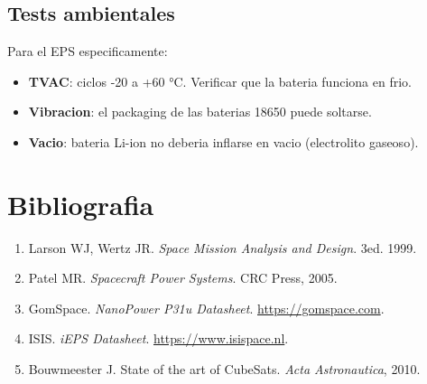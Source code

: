 \documentclass[11pt,a4paper,oneside,openright]{book}
\begin{document}
\section{Tests ambientales}

Para el EPS especificamente:
\begin{itemize}[leftmargin=2em]
  \item \textbf{TVAC}: ciclos -20 a +60 °C. Verificar que la bateria
        funciona en frio.
  \item \textbf{Vibracion}: el packaging de las baterias 18650 puede
        soltarse.
  \item \textbf{Vacio}: bateria Li-ion no deberia inflarse en vacio
        (electrolito gaseoso).
\end{itemize}

\backmatter

\chapter*{Bibliografia}

\begin{enumerate}[leftmargin=2em]
\item Larson WJ, Wertz JR. \emph{Space Mission Analysis and Design}. 3ed. 1999.
\item Patel MR. \emph{Spacecraft Power Systems}. CRC Press, 2005.
\item GomSpace. \emph{NanoPower P31u Datasheet}. \url{https://gomspace.com}.
\item ISIS. \emph{iEPS Datasheet}. \url{https://www.isispace.nl}.
\item Bouwmeester J. State of the art of CubeSats. \emph{Acta Astronautica}, 2010.
\end{enumerate}
\end{document}
